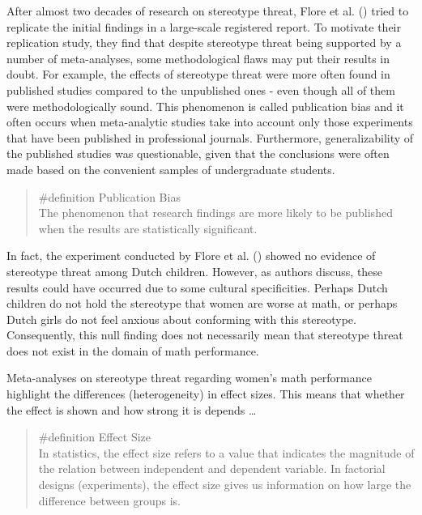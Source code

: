 \documentclass[
  letterpaper,
]{book}
\begin{document}
After almost two decades of research on stereotype threat, Flore et al.
() tried to replicate the
initial findings in a large-scale registered report. To motivate their
replication study, they find that despite stereotype threat being
supported by a number of meta-analyses, some methodological flaws may
put their results in doubt. For example, the effects of stereotype
threat were more often found in published studies compared to the
unpublished ones - even though all of them were methodologically sound.
This phenomenon is called publication bias and it often occurs when
meta-analytic studies take into account only those experiments that have
been published in professional journals. Furthermore, generalizability
of the published studies was questionable, given that the conclusions
were often made based on the convenient samples of undergraduate
students.

\begin{quote}
\label{def-publicationbias}{\#definition} Publication
Bias\\
The phenomenon that research findings are more likely to be published
when the results are statistically significant.
\end{quote}

In fact, the experiment conducted by Flore et al.
() showed no evidence of
stereotype threat among Dutch children. However, as authors discuss,
these results could have occurred due to some cultural specificities.
Perhaps Dutch children do not hold the stereotype that women are worse
at math, or perhaps Dutch girls do not feel anxious about conforming
with this stereotype. Consequently, this null finding does not
necessarily mean that stereotype threat does not exist in the domain of
math performance.

Meta-analyses on stereotype threat regarding women's math performance
highlight the differences (heterogeneity) in effect sizes. This means
that whether the effect is shown and how strong it is depends \ldots{}

\begin{quote}
\label{def-effectsize}{\#definition} Effect Size\\
In statistics, the effect size refers to a value that indicates the
magnitude of the relation between independent and dependent variable. In
factorial designs (experiments), the effect size gives us information on
how large the difference between groups is.
\end{quote}
\end{document}
